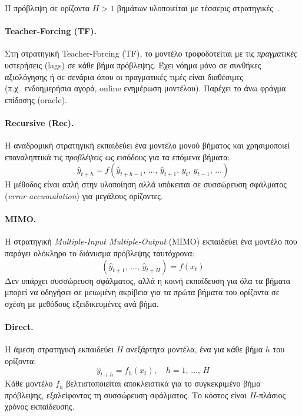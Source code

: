 Η πρόβλεψη σε ορίζοντα $H > 1$ βημάτων υλοποιείται
με τέσσερις στρατηγικές~\cite{taieb2012review,bontempi2012strategies}.

\paragraph{Teacher-Forcing (TF).}
Στη στρατηγική Teacher-Forcing (TF), το μοντέλο τροφοδοτείται με τις \emph{πραγματικές} υστερήσεις (lags) σε κάθε βήμα πρόβλεψης. Έχει νόημα μόνο σε συνθήκες αξιολόγησης ή σε σενάρια όπου οι
πραγματικές τιμές είναι διαθέσιμες (π.χ.\ ενδοημερήσια αγορά, online
ενημέρωση μοντέλου). Παρέχει το άνω φράγμα επίδοσης (oracle).

\paragraph{Recursive (Rec).}
Η αναδρομική στρατηγική εκπαιδεύει ένα μοντέλο
μονού βήματος και χρησιμοποιεί επαναληπτικά
τις \emph{προβλέψεις} ως εισόδους για τα επόμενα βήματα:
%
\begin{equation}
  \hat{y}_{t+h} = f\!\left(\hat{y}_{t+h-1},\,\ldots,\,\hat{y}_{t+1},\,y_t,\,y_{t-1},\,\ldots\right)
  \label{eq:recursive}
\end{equation}
%
Η μέθοδος είναι απλή στην υλοποίηση αλλά
υπόκειται σε συσσώρευση σφάλματος
(\textit{error accumulation}) για μεγάλους ορίζοντες.

\paragraph{MIMO.}
Η στρατηγική \textit{Multiple-Input Multiple-Output} (MIMO)
εκπαιδεύει ένα μοντέλο που παράγει ολόκληρο
το διάνυσμα πρόβλεψης ταυτόχρονα:
%
\begin{equation}
  \left(\hat{y}_{t+1},\,\ldots,\,\hat{y}_{t+H}\right)
    = f\!\left(x_t\right)
  \label{eq:mimo}
\end{equation}
%
Δεν υπάρχει συσσώρευση σφάλματος, αλλά η κοινή
εκπαίδευση για όλα τα βήματα μπορεί να οδηγήσει
σε μειωμένη ακρίβεια για τα πρώτα βήματα
του ορίζοντα σε σχέση με μεθόδους εξειδικευμένες ανά βήμα.

\paragraph{Direct.}
Η άμεση στρατηγική εκπαιδεύει $H$ ανεξάρτητα μοντέλα,
ένα για κάθε βήμα $h$ του ορίζοντα:
%
\begin{equation}
  \hat{y}_{t+h} = f_h\!\left(x_t\right),
    \quad h = 1,\,\ldots,\,H
  \label{eq:direct}
\end{equation}
%
Κάθε μοντέλο $f_h$ βελτιστοποιείται αποκλειστικά
για το συγκεκριμένο βήμα πρόβλεψης, εξαλείφοντας
τη συσσώρευση σφάλματος. Το κόστος είναι
$H$-πλάσιος χρόνος εκπαίδευσης.


